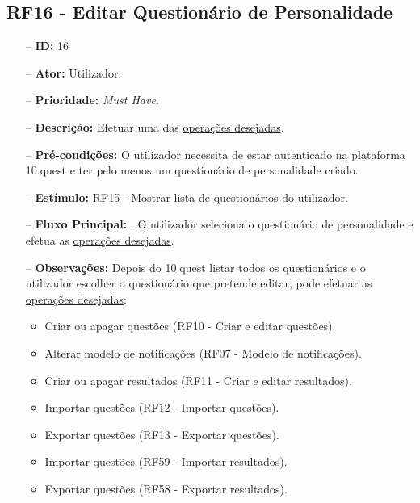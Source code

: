 \subsection{RF16 - Editar Questionário de Personalidade}
\begin{itemize}
	\item[--] \textbf{ID:} 16
	\item[--]  \textbf{Ator:} Utilizador.
	\item[--]  \textbf{Prioridade:} \textit{Must Have}.
	\item[--]  \textbf{Descrição:} Efetuar uma das \underline{operações desejadas}.
	\item[--]  \textbf{Pré-condições:} O utilizador necessita de estar autenticado na plataforma 10.quest e ter pelo menos um questionário de personalidade criado.
	\item[--]  \textbf{Estímulo:} RF15 - Mostrar lista de questionários do utilizador.
	\item[--]  \textbf{Fluxo Principal:} 
		. O utilizador seleciona o questionário de personalidade e efetua as \underline{operações desejadas}.
	\item[--]  \textbf{Observações:} Depois do 10.quest listar todos os questionários e o utilizador escolher o questionário que pretende editar, pode efetuar as \underline{operações desejadas}:
	\begin{itemize}
		\item Criar ou apagar questões (RF10 - Criar e editar questões).
		\item Alterar modelo de notificações (RF07 - Modelo de notificações).
		\item Criar ou apagar resultados (RF11 - Criar e editar resultados).
		\item Importar questões (RF12 - Importar questões).
		\item Exportar questões (RF13 - Exportar questões).
		\item Importar questões (RF59 - Importar resultados).
		\item Exportar questões (RF58 - Exportar resultados).
	\end{itemize}
\end{itemize}
\newpage


